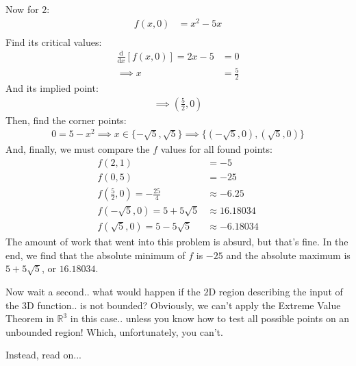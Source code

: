 Now for $2$:
\begin{align*}
	f(x, 0) &= x^2-5x\\
\end{align*}
Find its critical values:
\begin{align*}
	\frac{\mathrm{d}}{\mathrm{d}x}[f(x, 0)] = 2x-5&=0\\
	\implies x&=\frac{5}{2}
\end{align*}
And its implied point:
\begin{align*}
	\implies \left(\frac{5}{2}, 0\right)
\end{align*}
Then, find the corner points:
\begin{align*}
	0 = 5-x^2\implies x\in\{-\sqrt{5}, \sqrt{5}\}
	\implies \{(-\sqrt{5}, 0), (\sqrt{5}, 0)\}
\end{align*}
And, finally, we must compare the $f$ values for all found points:
\begin{align*}
	f(2, 1) &= -5\\
	f(0, 5) &= -25\\
	f\left(\frac{5}{2}, 0\right) = -\frac{25}{4} &\approx -6.25\\
	f(-\sqrt{5}, 0) = 5+5\sqrt{5} &\approx 16.18034\\
	f(\sqrt{5}, 0) = 5-5\sqrt{5} &\approx -6.18034
\end{align*}
The amount of work that went into this problem is absurd, but that's fine. In the end, we find that the absolute minimum of $f$ is $-25$ and the absolute maximum is $5+5\sqrt{5}$, or $16.18034$.

Now wait a second.. what would happen if the $2$D region describing the input of the $3$D function.. is not bounded?
Obviously, we can't apply the Extreme Value Theorem in $\mathbb{R}^3$ in this case.. unless you know how to test all possible points on an unbounded region!
Which, unfortunately, you can't.

Instead, read on...